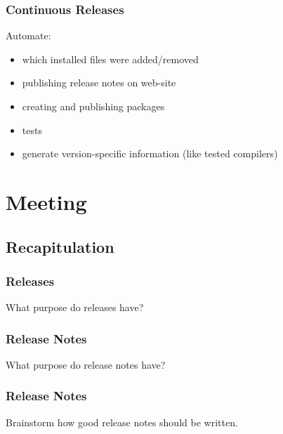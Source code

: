 \begin{frame}
	\frametitle{Continuous Releases}

	Automate:

	\begin{itemize}[<+-| alert@+>]
	\item which installed files were added/removed
	\item publishing release notes on web-site
	\item creating and publishing packages
	\item tests
	\item generate version-specific information (like tested compilers)
	\end{itemize}
\end{frame}

\section{Meeting}

\subsection{Recapitulation}


\begin{frame}
	\frametitle{Releases}

	\begin{task}
	What purpose do releases have?
	\end{task}
\end{frame}


\begin{frame}
	\frametitle{Release Notes}

	\begin{task}
	What purpose do release notes have?
	\end{task}
\end{frame}


\begin{frame}
	\frametitle{Release Notes}

	\begin{task}
	Brainstorm how good release notes should be written.
	\end{task}
\end{frame}

